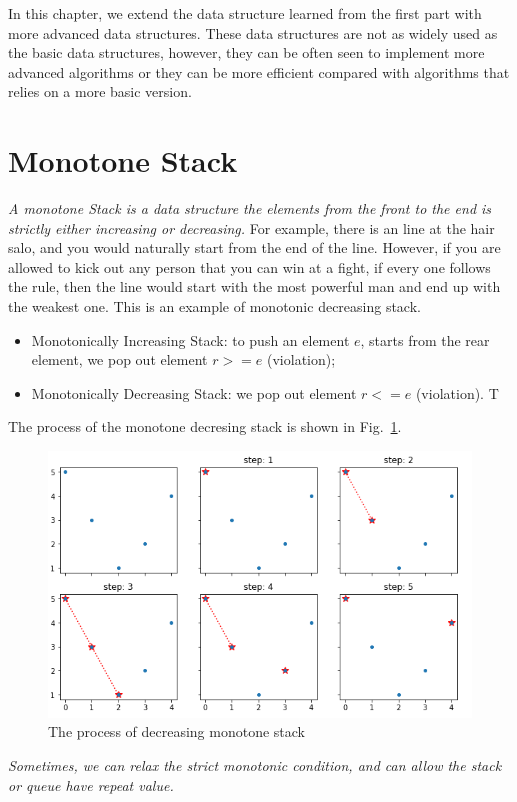 \documentclass[../main.tex]{subfiles}
\begin{document}
In this chapter, we extend the data structure learned from the first part with more advanced data structures. These data structures are not as widely used as the basic data structures, however, they can be often seen to implement more advanced algorithms or they can be more efficient compared with algorithms that relies on a more basic version. 

\section{Monotone Stack}
\label{section_mono_stack}
\textit{A monotone Stack is a data structure the elements from the front to the end is strictly either increasing or decreasing. } For example, there is an line at the hair salo, and you would naturally start from the end of the line. However, if you are allowed to kick out any person that you can win at a fight, if every one follows the rule, then the line would start with the most powerful man and end up with the weakest one. This is an example of monotonic decreasing stack. 
\begin{itemize}
    \item Monotonically Increasing Stack: to push an element $e$, starts from the rear element, we pop out element $r>=e$ (violation); 
    \item Monotonically Decreasing Stack: we pop out element $r<=e$ (violation). T
\end{itemize}
The process of the monotone decresing stack is shown in Fig.~\ref{fig:mono_stack}.
\begin{figure}[h!]
    \centering
    \includegraphics[width=0.9\columnwidth]{fig/monotone_stack_fig.png}
    \caption{The process of decreasing monotone stack}
    \label{fig:mono_stack}
\end{figure}
\textit{Sometimes, we can relax the strict monotonic condition, and can allow the stack or queue have repeat value. }
\end{document}
